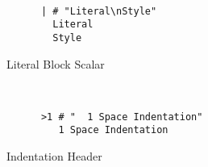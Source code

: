 \begin{figure}[H]
  \begin{minipage}[t]{0.48\textwidth}
    \vspace{0pt}
    \begin{bchart}[max=9, width=0.85\textwidth]
    \end{bchart}
  \end{minipage}
  \begin{minipage}[t]{0pt}~\end{minipage}
  \begin{minipage}[t]{0.48\textwidth}
    \vspace{0pt}
    \begin{verbatim}
      | # "Literal\nStyle"
        Literal
        Style
    \end{verbatim}
  \end{minipage}
  \caption{Literal Block Scalar}
\end{figure}

\begin{figure}[H]
  \begin{minipage}[t]{0.48\textwidth}
    \vspace{0pt}
    \begin{bchart}[max=9, width=0.85\textwidth]
    \end{bchart}
  \end{minipage}
  \begin{minipage}[t]{0pt}~\end{minipage}
  \begin{minipage}[t]{0.48\textwidth}
    \vspace{0pt}
    \begin{verbatim}
      >1 # "  1 Space Indentation"
         1 Space Indentation
    \end{verbatim}
  \end{minipage}
  \caption{Indentation Header}
\end{figure}


